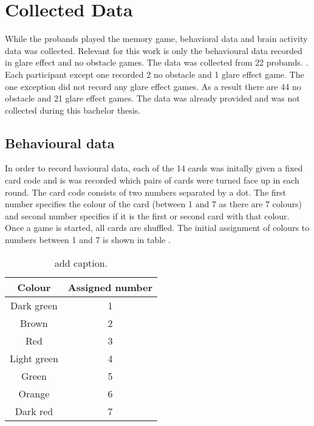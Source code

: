 \chapter{Collected Data}
\label{collected_data}
While the probands played the memory game, behavioral data and brain activity data was collected. Relevant for this work is only the behavioural data recorded in glare effect and no obstacle games. The data was collected from 22 probands. . Each participant except one recorded 2 no obstacle and 1 glare effect game. The one exception did not record any glare effect games. As a result there are 44 no obstacle and 21 glare effect games. The data was already provided and was not collected during this bachelor thesis.

\section{Behavioural data}
\label{behavioural_data}
In order to record bavioural data, each of the 14 cards was initally given a fixed card code and is was recorded which pairs of cards were turned face up in each round. The card code consists of two numbers separated by a dot. The first number specifies the colour of the card (between 1 and 7 as there are 7 colours) and second number specifies if it is the first or second card with that colour. Once a game is started, all cards are shuffled. The initial assignment of colours to numbers between 1 and 7 is shown in table .

\begin{table}[H]
	\centering
	\caption{add caption.}
	\label{tab:colorAssign}
	\begin{tabular}{|c|c|}
		\hline
		Colour & Assigned number  \\
		\hline
		Dark green & 1 \\
		Brown & 2 \\
		Red & 3 \\
		Light green & 4 \\
		Green & 5 \\
		Orange & 6 \\
		Dark red & 7 \\
		\hline
	\end{tabular}
\end{table}

